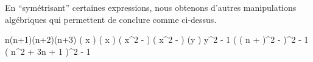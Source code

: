 En \enquote{symétrisant} certaines expressions, nous obtenons d'autres manipulations algébriques qui permettent de conclure comme ci-dessus.

\medskip

\begin{stepcalc}[style = sar]
\explnext{}
	n(n+1)(n+2)(n+3)
	\big( x \pm {} \big) \big( x \pm {} \big)
\explnext{}
	\big( x^2 -  \big) \big( x^2 -  \big)
	(y )
\explnext{}
	y^2 - 1
\explnext{}
	\Big( \big( n +  \big)^2 -  \Big)^2 - 1
\explnext{}
	\big( n^2 + 3n + 1 \big)^2 - 1
\end{stepcalc}

\vspace{-1.5ex}
\qedhere